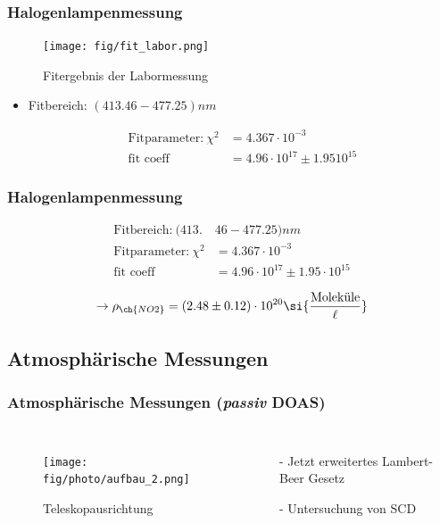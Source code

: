 \documentclass{beamer}
\begin{document}
\begin{frame}
	\frametitle{Halogenlampenmessung}
     \begin{figure}[h]
    	\texttt{[image: fig/fit\_labor.png]}
    	\caption{Fitergebnis der  Labormessung}
    \end{figure}

    \begin{itemize} 
    	\item Fitbereich: $(413.46 - 477.25) \si{nm}$
    	
    		\begin{align}
    		   \text{Fitparameter:}\ \chi^2 &= 4.367 \cdot 10^{-3}\\
    		   \text{fit coeff} &= 4.96 \cdot 10^{17} \pm 1.95 10^{15}
    		\end{align}
    		
    \end{itemize}
\end{frame} 

\begin{frame}
	\frametitle{Halogenlampenmessung}
	\begin{align}
		\text{Fitbereich:}\ (413.&46 - 477.25) \si{nm}\\
		\text{Fitparameter:}\ \chi^2 &= 4.367 \cdot 10^{-3}\\
		\text{fit coeff} &= 4.96 \cdot 10^{17} \pm 1.95 \cdot 10^{15}
	\end{align}
	
	\begin{align}    
		\to \rho_{\ch{NO2}} = (2.48 \pm 0.12) \cdot 10^{20} \si{\frac{\text{Moleküle}}{\ell}}
	\end{align}
\end{frame}

\begin{frame}
    \section{Atmosphärische Messungen}
    \frametitle{Atmosphärische Messungen (\textit{passiv} DOAS)}
    \begin{columns}
    	\begin{figure}[h]
    		\texttt{[image: fig/photo/aufbau\_2.png]}
    		\caption{Teleskopausrichtung}
    	\end{figure}
    	\begin{itemize}
    		\item[-] Jetzt erweitertes Lambert-Beer Gesetz
    		\item[-] Untersuchung von SCD
    	\end{itemize}
    \end{columns}
\end{frame}
\end{document}
